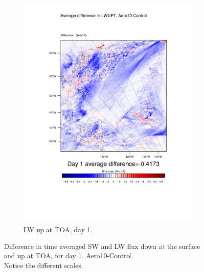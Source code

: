 \begin{figure}
\begin{subfigure}{0.48\textwidth}
		\includegraphics[width=\textwidth]{results/aero10/diff_Aero10_LWUPT_Day1.pdf}
		\caption{LW up at TOA, day 1.}
		\label{subfig:lwup_r3Day1}
	\end{subfigure}
	\caption{Difference in time averaged SW and LW flux down at the surface and up at TOA, for day 1. Aero10-Control.\\Notice the different scales.}
	\label{fig:radiation_r3Day1}
\end{figure}

